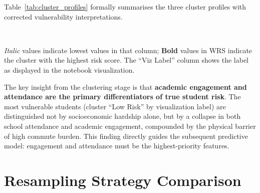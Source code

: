 Table~\ref{tab:cluster_profiles} formally summarises the three cluster profiles with corrected vulnerability interpretations.

\begin{table}[!htbp]
    \centering
    \caption{K-Means Cluster Profiles ($k=3$, $N=400$) with Corrected Vulnerability Interpretation}
    \label{tab:cluster_profiles}
    \\ \medskip
    \raggedright \footnotesize \textit{Italic} values indicate lowest values in that column; \textbf{Bold} values in WRS indicate the cluster with the highest risk score. The ``Viz Label'' column shows the label as displayed in the notebook visualization.
\end{table}

The key insight from the clustering stage is that \textbf{academic engagement and attendance are the primary differentiators of true student risk}. The most vulnerable students (cluster ``Low Risk'' by visualization label) are distinguished not by socioeconomic hardship alone, but by a collapse in both school attendance and academic engagement, compounded by the physical barrier of high commute burden. This finding directly guides the subsequent predictive model: engagement and attendance must be the highest-priority features.

\section{Resampling Strategy Comparison}
\label{sec:resampling_comparison}

